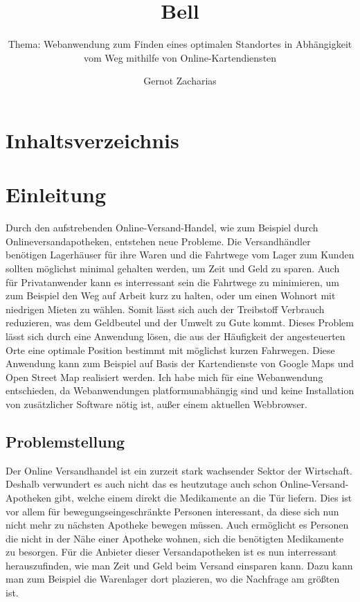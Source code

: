 \documentclass[a4paper, twoside, 12pt]{scrreprt}
\title{Bell}
\author{Gernot Zacharias}
\subtitle{Thema: Webanwendung zum Finden eines optimalen Standortes in Abhängigkeit vom Weg mithilfe von Online-Kartendiensten}
\begin{document}
\listoftodos
\maketitle
\cleardoublepage
\chapter {Inhaltsverzeichnis}
\setcounter{page}{1}
\chapter {Einleitung}
Durch den aufstrebenden Online-Versand-Handel, wie zum Beispiel durch Onlineversandapotheken, entstehen neue Probleme.
Die Versandhändler benötigen Lagerhäuser für ihre Waren und die Fahrtwege vom Lager zum Kunden sollten möglichst minimal gehalten werden,
um Zeit und Geld zu sparen. Auch für Privatanwender kann es interressant sein die Fahrtwege zu minimieren, um zum Beispiel den Weg auf Arbeit kurz zu halten, oder
um einen Wohnort mit niedrigen Mieten zu wählen. Somit lässt sich auch der Treibstoff Verbrauch reduzieren, was dem Geldbeutel und der Umwelt zu Gute kommt.
Dieses Problem lässt sich durch eine Anwendung lösen, die aus der Häufigkeit der angesteuerten Orte eine optimale Position bestimmt mit möglichst 
kurzen Fahrwegen. Diese Anwendung kann zum Beispiel auf Basis  der Kartendienste von Google Maps und Open Street Map realisiert werden.
Ich habe mich für eine Webanwendung entschieden, da Webanwendungen platformunabhängig sind und keine Installation von zusätzlicher Software nötig ist, außer 
einem aktuellen Webbrowser.
\cleardoublepage
\section {Problemstellung}
Der Online Versandhandel ist ein zurzeit stark wachsender Sektor der Wirtschaft.
Deshalb verwundert es auch nicht das es heutzutage auch schon Online-Versand-Apotheken gibt, welche einem direkt die Medikamente an die Tür liefern.
Dies ist vor allem für bewegungseingeschränkte Personen interessant, da diese sich nun nicht mehr zu nächsten Apotheke bewegen müssen.
Auch ermöglicht es Personen die nicht in der Nähe einer Apotheke wohnen, sich die benötigten Medikamente zu besorgen.
Für die Anbieter dieser Versandapotheken ist es nun interressant herauszufinden, wie man Zeit und Geld beim Versand einsparen kann.
Dazu kann man zum Beispiel die Warenlager dort plazieren, wo die Nachfrage am größten ist.
\end{document}
